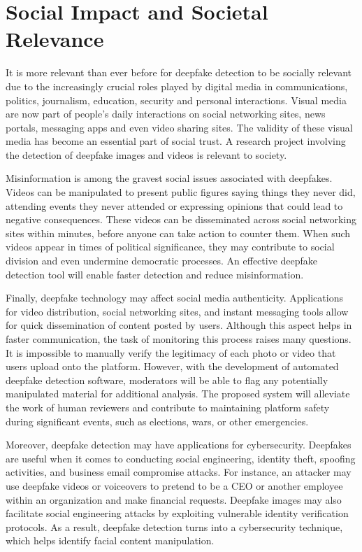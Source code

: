 \documentclass[12pt,a4paper]{report}
\begin{document}
\section{Social Impact and Societal Relevance}

It is more relevant than ever before for deepfake detection to be socially relevant due to the increasingly crucial roles played by digital media in communications, politics, journalism, education, security and personal interactions. Visual media are now part of people's daily interactions on social networking sites, news portals, messaging apps and even video sharing sites. The validity of these visual media has become an essential part of social trust. A research project involving the detection of deepfake images and videos is relevant to society.

Misinformation is among the gravest social issues associated with deepfakes. Videos can be manipulated to present public figures saying things they never did, attending events they never attended or expressing opinions that could lead to negative consequences. These videos can be disseminated across social networking sites within minutes, before anyone can take action to counter them. When such videos appear in times of political significance, they may contribute to social division and even undermine democratic processes. An effective deepfake detection tool will enable faster detection and reduce misinformation.

Finally, deepfake technology may affect social media authenticity. Applications for video distribution, social networking sites, and instant messaging tools allow for quick dissemination of content posted by users. Although this aspect helps in faster communication, the task of monitoring this process raises many questions. It is impossible to manually verify the legitimacy of each photo or video that users upload onto the platform. However, with the development of automated deepfake detection software, moderators will be able to flag any potentially manipulated material for additional analysis. The proposed system will alleviate the work of human reviewers and contribute to maintaining platform safety during significant events, such as elections, wars, or other emergencies.

Moreover, deepfake detection may have applications for cybersecurity. Deepfakes are useful when it comes to conducting social engineering, identity theft, spoofing activities, and business email compromise attacks. For instance, an attacker may use deepfake videos or voiceovers to pretend to be a CEO or another employee within an organization and make financial requests. Deepfake images may also facilitate social engineering attacks by exploiting vulnerable identity verification protocols. As a result, deepfake detection turns into a cybersecurity technique, which helps identify facial content manipulation.
\end{document}
